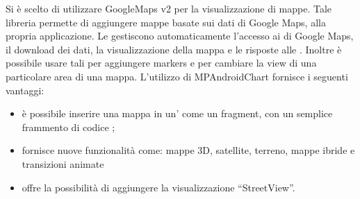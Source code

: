 Si è scelto di utilizzare GoogleMaps   v2 per la visualizzazione di mappe. Tale libreria permette di aggiungere mappe basate sui dati di Google Maps, alla propria applicazione. Le  gestiscono automaticamente l'accesso ai  di Google Maps, il download dei dati, la visualizzazione della mappa e le risposte alle . Inoltre è possibile usare tali  per aggiungere markers e per cambiare la view di una particolare area di una mappa.
L'utilizzo di MPAndroidChart fornisce i seguenti vantaggi:
\begin{itemize}
\item è possibile inserire una mappa in un' come un fragment, con un semplice frammento di codice ;
\item fornisce nuove funzionalità come: mappe 3D, satellite, terreno, mappe ibride e transizioni animate
\item offre la possibilità di aggiungere la visualizzazione “StreetView”.
\end{itemize}
